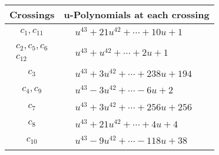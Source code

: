 \documentclass[1p]{elsarticle_modified}
\theoremstyle{definition}
\begin{document}
\begin{tabular}{m{50pt}|m{274pt}}
Crossings & \hspace{64pt}u-Polynomials at each crossing \\
\hline $$\begin{aligned}c_{1},c_{11}\end{aligned}$$&$\begin{aligned}
&u^{43}+21 u^{42}+\cdots+10 u+1
\end{aligned}$\\
\hline $$\begin{aligned}c_{2},c_{5},c_{6}\\c_{12}\end{aligned}$$&$\begin{aligned}
&u^{43}+u^{42}+\cdots+2 u+1
\end{aligned}$\\
\hline $$\begin{aligned}c_{3}\end{aligned}$$&$\begin{aligned}
&u^{43}+3 u^{42}+\cdots+238 u+194
\end{aligned}$\\
\hline $$\begin{aligned}c_{4},c_{9}\end{aligned}$$&$\begin{aligned}
&u^{43}-3 u^{42}+\cdots-6 u+2
\end{aligned}$\\
\hline $$\begin{aligned}c_{7}\end{aligned}$$&$\begin{aligned}
&u^{43}+3 u^{42}+\cdots+256 u+256
\end{aligned}$\\
\hline $$\begin{aligned}c_{8}\end{aligned}$$&$\begin{aligned}
&u^{43}+21 u^{42}+\cdots+4 u+4
\end{aligned}$\\
\hline $$\begin{aligned}c_{10}\end{aligned}$$&$\begin{aligned}
&u^{43}-9 u^{42}+\cdots-118 u+38
\end{aligned}$\\
\hline
\end{tabular}\\~\\
\end{document}
